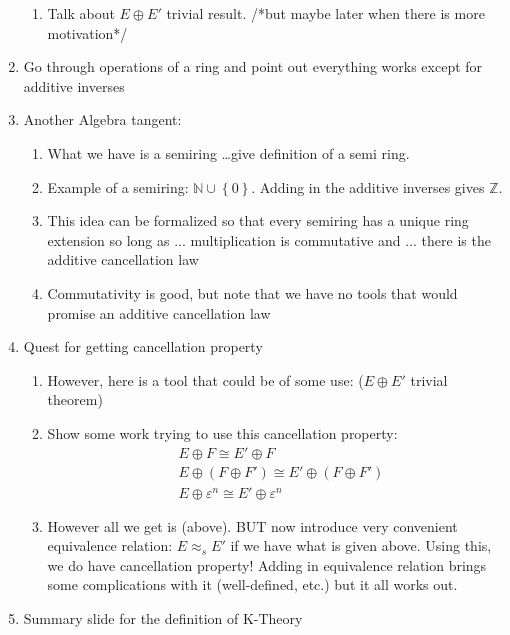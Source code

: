 \documentclass[leqno]{amsart}
\theoremstyle{definition}
\newcommand{\toadd}[1]{/*#1*/}
\newcommand{\iso}{\cong} %
\newcommand{\siso}{\approx_s} %
\newcommand{\set}[1]{\left\{#1\right\}}
\newcommand{\N}{\mathbb{N}}
\newcommand{\Z}{\mathbb{Z}}
\newcommand{\tbund}[1]{\varepsilon^{#1}}
\newcommand{\op}{\oplus}
\begin{document}
\begin{enumerate}
\begin{enumerate}
				\item Talk about $E \op E'$ trivial result. \toadd{but maybe later when there is more motivation}
			\end{enumerate}
		\item Go through operations of a ring and point out everything works except for additive inverses
		\item Another Algebra tangent:
			\begin{enumerate}
				\item What we have is a semiring \dots give definition of a semi ring.
				\item Example of a semiring: $\N \cup \set{0}$. Adding in the additive inverses gives $\Z$.
				\item This idea can be formalized so that every semiring has a unique ring extension so long as ... multiplication is commutative and ... there is the additive cancellation law
				\item Commutativity is good, but note that we have no tools that would promise an additive cancellation law
			\end{enumerate}
		\item Quest for getting cancellation property
			\begin{enumerate}
				\item However, here is a tool that could be of some use: ($E \op E'$ trivial theorem)
				\item Show some work trying to use this cancellation property:
				\begin{align*}
					&E \op F \iso E' \op F\\
					&E \op (F \op F') \iso E' \op (F \op F')\\
					&E \op \tbund{n} \iso E' \op \tbund{n}
				\end{align*}
				\item However all we get is (above). BUT now introduce very convenient equivalence relation: $E \siso E'$ if we have what is given above. Using this, we do have cancellation property! Adding in equivalence relation brings some complications with it (well-defined, etc.) but it all works out.
			\end{enumerate}
		\item Summary slide for the definition of K-Theory
	\end{enumerate}
\end{document}
